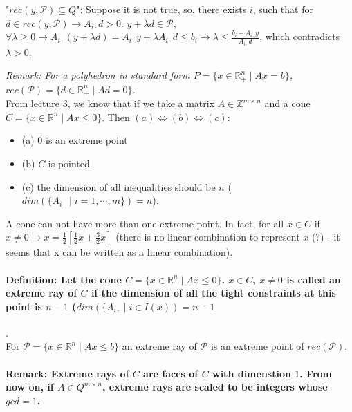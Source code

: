 \documentclass[main]{subfiles}
\begin{document}
"$rec(y, \mathcal{P}) \subseteq Q$": Suppose it is not true, so, there exists
$i$, such that for $d \in rec(y, \mathcal{P}) \rightarrow A_{i\cdot}d > 0$. $y+ \lambda d
\in \mathcal{P}$, $\forall \lambda \geq 0 \rightarrow A_{i\cdot} (y + \lambda
d) = A_{i\cdot}y + \lambda A_{i\cdot} d \leq b_i \rightarrow \lambda \leq
\frac{b_i - A_{i\cdot}y}{A_{i\cdot}d}$, which contradicts $\lambda > 0$.


\emph{Remark: For a polyhedron in standard form $P=\{x \in \mathbb{R}^n_+ \mid
Ax = b \}$, $rec(\mathcal{P}) = \{d \in \mathbb{R}^n_+ \mid Ad = 0 \}$. }\\

From lecture 3, we know that if we take a matrix $A \in \mathbb{Z}^{m\times n}$
and a cone $C = \{x \in \mathbb{R}^n \mid Ax \leq 0 \}$. Then $(a) \iff (b)
\iff (c)$:
\begin{itemize}
\item (a) $0$ is an extreme point
\item (b) $C$ is pointed
\item (c) the dimension of all inequalities should be $n$ ($dim(\{A_{i\cdot} 
\mid i = 1, \cdots, m \}) = n$). 
\end{itemize}

A cone can not have more than one extreme point. In fact, for all $x \in C$ if
$x \neq 0 \rightarrow x = \frac{1}{2}[\frac{1}{2}x + \frac{3}{2}x]$ (there is
no linear combination to represent $x$ (?) - it seems that x can be written as
a linear combination).


\paragraph{Definition: Let the cone $C =\{x \in \mathbb{R}^n \mid Ax \leq 0\}$.
$x \in C$, $ x \neq 0$ is called an extreme ray of $C$ if the dimension of all
the tight constraints at this point is $n-1$ ($dim(\{A_{i\cdot} \mid i \in
I(x)) = n-1$}.\\
For $\mathcal{P} = \{x \in \mathbb{R}^n \mid Ax \leq b \}$ an extreme ray of
$\mathcal{P}$ is an extreme point of $rec(\mathcal{P})$.

\paragraph{Remark: Extreme rays of $C$ are faces of $C$ with dimenstion $1$. 
From now on, if $A \in Q^{m \times n}$, extreme rays are scaled to be integers 
whose $gcd = 1$.}
\end{document}
